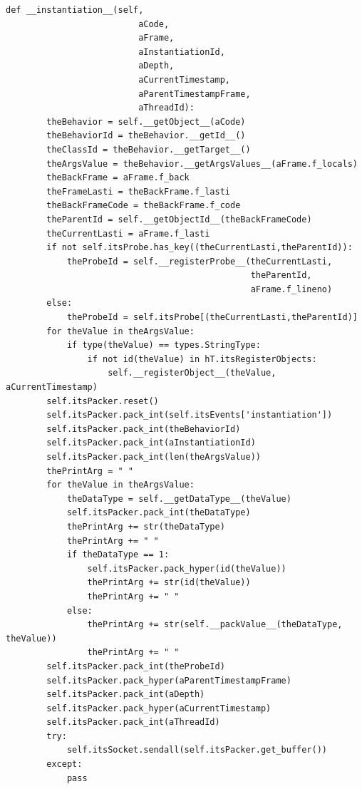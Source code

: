 \documentclass[12pt,legalpaper]{report}
\begin{document}
\begin{singlespace}
\begin{lstlisting}[style=Python]
    def __instantiation__(self, 
                          aCode, 
                          aFrame, 
                          aInstantiationId, 
                          aDepth, 
                          aCurrentTimestamp, 
                          aParentTimestampFrame, 
                          aThreadId):
        theBehavior = self.__getObject__(aCode)
        theBehaviorId = theBehavior.__getId__()
        theClassId = theBehavior.__getTarget__()
        theArgsValue = theBehavior.__getArgsValues__(aFrame.f_locals)
        theBackFrame = aFrame.f_back
        theFrameLasti = theBackFrame.f_lasti
        theBackFrameCode = theBackFrame.f_code
        theParentId = self.__getObjectId__(theBackFrameCode)
        theCurrentLasti = aFrame.f_lasti        
        if not self.itsProbe.has_key((theCurrentLasti,theParentId)):
            theProbeId = self.__registerProbe__(theCurrentLasti,
                                                theParentId,
                                                aFrame.f_lineno)
        else:
            theProbeId = self.itsProbe[(theCurrentLasti,theParentId)]
        for theValue in theArgsValue:
            if type(theValue) == types.StringType:
                if not id(theValue) in hT.itsRegisterObjects:
                    self.__registerObject__(theValue, aCurrentTimestamp)
        self.itsPacker.reset()       
        self.itsPacker.pack_int(self.itsEvents['instantiation'])
        self.itsPacker.pack_int(theBehaviorId)
        self.itsPacker.pack_int(aInstantiationId)
        self.itsPacker.pack_int(len(theArgsValue))
        thePrintArg = " "
        for theValue in theArgsValue:
            theDataType = self.__getDataType__(theValue)               
            self.itsPacker.pack_int(theDataType)
            thePrintArg += str(theDataType)
            thePrintArg += " "
            if theDataType == 1:
                self.itsPacker.pack_hyper(id(theValue))
                thePrintArg += str(id(theValue))
                thePrintArg += " "
            else:
                thePrintArg += str(self.__packValue__(theDataType, theValue))
                thePrintArg += " "
        self.itsPacker.pack_int(theProbeId)
        self.itsPacker.pack_hyper(aParentTimestampFrame)
        self.itsPacker.pack_int(aDepth)    
        self.itsPacker.pack_hyper(aCurrentTimestamp)
        self.itsPacker.pack_int(aThreadId)
        try:
            self.itsSocket.sendall(self.itsPacker.get_buffer())
        except:
            pass
    

\end{lstlisting}
\end{singlespace}
\end{document}
